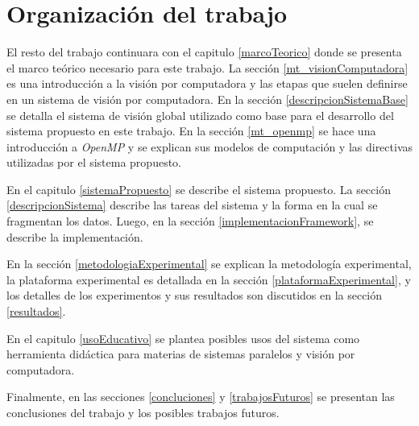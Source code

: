 
\section{Organización del trabajo}

El resto del trabajo continuara con el capitulo \ref{marcoTeorico} donde se
presenta el marco teórico necesario para este trabajo. La sección
\ref{mt_visionComputadora} es una introducción a la visión por computadora y las
etapas que suelen definirse en un sistema de visión por computadora. En la
sección \ref{descripcionSistemaBase} se detalla el sistema de visión global
utilizado como base para el desarrollo del sistema propuesto en este trabajo.
En la sección \ref{mt_openmp} se hace una introducción a \emph{OpenMP} y se
explican sus modelos de computación y las directivas utilizadas por el sistema
propuesto.

En el capitulo \ref{sistemaPropuesto} se describe el sistema propuesto. La
sección \ref{descripcionSistema} describe las tareas del sistema y la forma en
la cual se fragmentan los datos. Luego, en la sección
\ref{implementacionFramework}, se describe la implementación.

En la sección \ref{metodologiaExperimental} se explican la metodología
experimental, la plataforma experimental es detallada en la sección
\ref{plataformaExperimental}, y los detalles de los experimentos y sus
resultados son discutidos en la sección \ref{resultados}.

En el capitulo \ref{usoEducativo} se plantea posibles usos del sistema como
herramienta didáctica para materias de sistemas paralelos y visión por
computadora.

Finalmente, en las secciones \ref{concluciones} y \ref{trabajosFuturos} se
presentan las conclusiones del trabajo y los posibles trabajos futuros.
